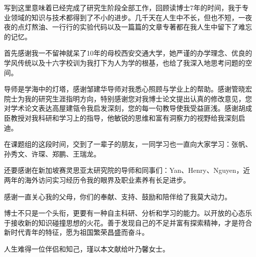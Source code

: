 


写到这里意味着已经完成了研究生阶段全部工作，回顾读博士7年的时间，我于专业领域的知识与技术都得到了不小的进步。几千天在人生中不长，但也不短，一夜夜的点灯熬油、一行行的实验代码以及一篇篇的文章专著都在我人生中留下了难忘的记忆。


首先感谢我一不留神就呆了10年的母校西安交通大学，她严谨的办学理念、优良的学风传统以及十六字校训为我打下为人为学的根基，也给了我深入地思考问题的空间。

导师是学海中的灯塔，感谢邹建华导师对我悉心照顾与学业上的帮助。感谢管晓宏院士为我的研究生涯指明方向，特别感谢您对我博士论文提出认真的修改意见，您对学术论文表达高屋建瓴令我启发深刻，您的每一句教导使我受益匪浅。感谢胡成臣教授对我科研和学习上的指导，他敏锐的思维和富有洞察力的视野给我深刻启迪。

在课题组的这段时间，交到了一辈子的朋友，一同学习也一直向大家学习：张帆、孙秀文、许琛、郑鹏、王瑞龙。

还要感谢在新加坡赛灵思亚太研究院的导师和同事们：Yan、Henry、Nguyen，近两年的海外访问实习经历令我的眼界及职业素养有长足进步。

感谢一直关心我的父母，你们的奉献、支持、鼓励和陪伴给了我莫大动力。

博士不只是一个头衔，更要有一种自主科研、分析和学习的能力。以开放的心态乐于接收新的知识碰撞思想的火花。善于发现自己的不足并富有探索精神，才是符合新时代青年的特征，愿为祖国繁荣昌盛而奋斗。

人生难得一位伴侣和知己，瑾以本文献给叶乃馨女士。

